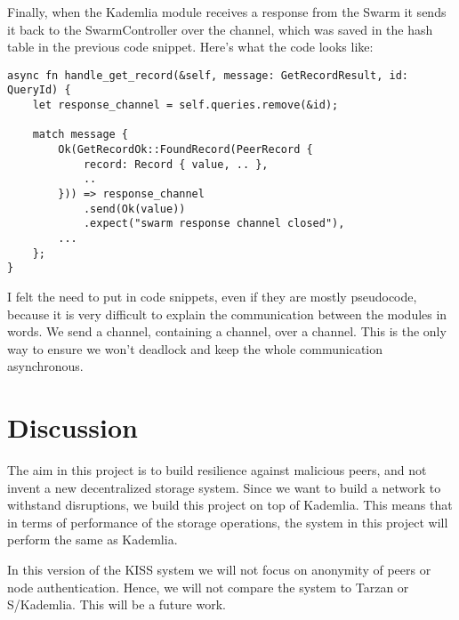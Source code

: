 \documentclass[ twoside,openright,titlepage,numbers=noenddot,headinclude,%
                footinclude=true,cleardoublepage=empty,abstractoff, %
                BCOR=5mm,paper=a4,fontsize=11pt,%
                ngerman,american,%
                ]{scrreprt}
\begin{document}
Finally, when the Kademlia module receives a response from the Swarm it sends it back to the SwarmController
over the channel, which was saved in the hash table in the previous code snippet.
Here's what the code looks like:

\begin{verbatim}
async fn handle_get_record(&self, message: GetRecordResult, id: QueryId) {
    let response_channel = self.queries.remove(&id);

    match message {
        Ok(GetRecordOk::FoundRecord(PeerRecord {
            record: Record { value, .. },
            ..
        })) => response_channel
            .send(Ok(value))
            .expect("swarm response channel closed"),
        ...
    };
}
\end{verbatim}

I felt the need to put in code snippets, even if they are mostly pseudocode,
because it is very difficult to explain the communication between the modules in words.
We send a channel, containing a channel, over a channel.
This is the only way to ensure we won't deadlock and keep the whole communication asynchronous.



\chapter{Discussion}
\label{cha:discussion}

The aim in this project is to build resilience against malicious peers,
and not invent a new decentralized storage system.
Since we want to build a network to withstand disruptions, we build this project on top of Kademlia.
This means that in terms of performance of the storage operations, the system in this project will perform the same
as Kademlia.

In this version of the KISS system we will not focus on anonymity of peers or node authentication.
Hence, we will not compare the system to Tarzan or S/Kademlia.
This will be a future work.
\end{document}
